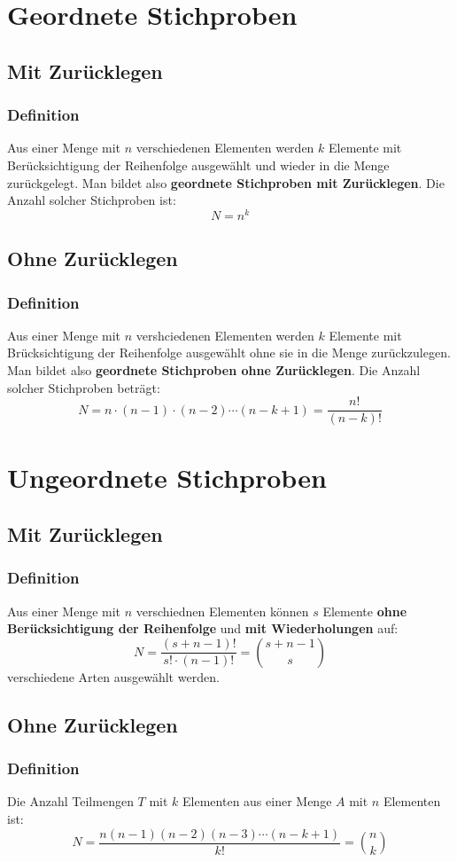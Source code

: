 \documentclass[12pt,a4paper]{article} %
\begin{document}
\section{Geordnete Stichproben}
\subsection{Mit Zurücklegen}
\subsubsection{Definition}
Aus einer Menge mit $n$ verschiedenen Elementen werden $k$ Elemente mit Berücksichtigung der Reihenfolge ausgewählt und wieder in die Menge zurückgelegt. Man bildet also \textbf{geordnete Stichproben mit Zurücklegen}. Die Anzahl solcher Stichproben ist: $$ N = n^k$$
\subsection{Ohne Zurücklegen}
\subsubsection{Definition}
Aus einer Menge mit $n$ vershciedenen Elementen werden $k$ Elemente mit Brücksichtigung der Reihenfolge ausgewählt ohne sie in die Menge zurückzulegen. Man bildet also \textbf{geordnete Stichproben ohne Zurücklegen}. Die Anzahl solcher Stichproben beträgt: $$N = n\cdot (n-1) \cdot (n-2) \cdots (n-k+1) = \frac{n!}{(n-k)!}$$

\section{Ungeordnete Stichproben}
\subsection{Mit Zurücklegen}
\subsubsection{Definition}
Aus einer Menge mit $n$ verschiednen Elementen können $s$ Elemente \textbf{ohne Berücksichtigung der Reihenfolge} und \textbf{mit Wiederholungen} auf:
$$N=\frac{(s+n-1)!}{s!\cdot (n-1)!} = \binom {s+n-1}{s}$$
verschiedene Arten ausgewählt werden.

\subsection{Ohne Zurücklegen}
\subsubsection{Definition}
Die Anzahl Teilmengen $T$ mit $k$ Elementen aus einer Menge $A$ mit $n$ Elementen ist:
$$N=\frac{n(n-1)(n-2)(n-3)\cdots (n-k+1)}{k!}=\binom {n}{k}$$
\end{document}
